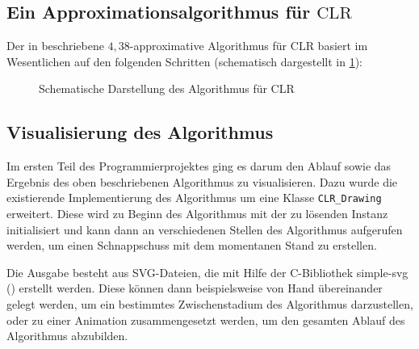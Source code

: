 \documentclass[a4paper,ngerman,12pt,bibtotoc]{scrartcl}
\theoremstyle{definition}
\theoremstyle{plain}
\theoremstyle{remark}
\newcommand{\CLR}{\mathrm{CLR}}
\def\Cpp{{C\nolinebreak[4]\hspace{-.05em}\raisebox{.4ex}{\tiny\bf ++}}}
\begin{document}
	\subsection{Ein Approximationsalgorithmus für $\CLR$}

Der in \cite{AAfCLR} beschriebene $4,38$-approximative Algorithmus für $\CLR$ basiert im Wesentlichen auf den folgenden Schritten (schematisch dargestellt in \cref{fig:CLRAlg}):



\begin{figure}[H]
	\begin{tiny}
		
	\end{tiny}
	\caption{Schematische Darstellung des Algorithmus für CLR}\label{fig:CLRAlg}
\end{figure}

\subsection{Visualisierung des Algorithmus}

Im ersten Teil des Programmierprojektes ging es darum den Ablauf sowie das Ergebnis des oben beschriebenen Algorithmus zu visualisieren. Dazu wurde die existierende Implementierung des Algorithmus um eine Klasse \texttt{CLR\_Drawing} erweitert. Diese wird zu Beginn des Algorithmus mit der zu lösenden Instanz initialisiert und kann dann an verschiedenen Stellen des Algorithmus aufgerufen werden, um einen Schnappschuss mit dem momentanen Stand zu erstellen. 

Die Ausgabe besteht aus SVG-Dateien, die mit Hilfe der \Cpp-Bibliothek simple-svg (\cite{simple-svg}) erstellt werden. Diese können dann beispielsweise von Hand übereinander gelegt werden, um ein bestimmtes Zwischenstadium des Algorithmus darzustellen, oder zu einer Animation zusammengesetzt werden, um den gesamten Ablauf des Algorithmus abzubilden. 
\end{document}
